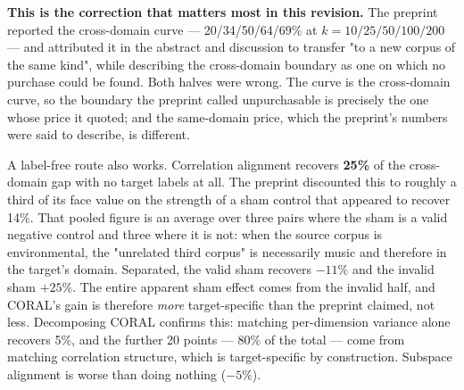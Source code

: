 \textbf{This is the correction that matters most in this revision.} The
preprint reported the cross-domain curve --- 20/34/50/64/69\% at
$k = 10/25/50/100/200$ --- and attributed it in the abstract and discussion to
transfer "to a new corpus of the same kind", while describing the cross-domain
boundary as one on which no purchase could be found. Both halves were wrong.
The curve is the cross-domain curve, so the boundary the preprint called
unpurchasable is precisely the one whose price it quoted; and the same-domain
price, which the preprint's numbers were said to describe, is different.

A label-free route also works. Correlation alignment recovers \textbf{25\%} of
the cross-domain gap with no target labels at all. The preprint discounted
this to roughly a third of its face value on the strength of a sham control
that appeared to recover 14\%. That pooled figure is an average over three
pairs where the sham is a valid negative control and three where it is not:
when the source corpus is environmental, the "unrelated third corpus" is
necessarily music and therefore in the target's domain. Separated, the valid
sham recovers $-11\%$ and the invalid sham $+25\%$. The entire apparent sham
effect comes from the invalid half, and CORAL's gain is therefore
\emph{more} target-specific than the preprint claimed, not less.
Decomposing CORAL confirms this: matching per-dimension variance alone
recovers 5\%, and the further 20 points --- 80\% of the total --- come from
matching correlation structure, which is target-specific by construction.
Subspace alignment is worse than doing nothing ($-5\%$).

